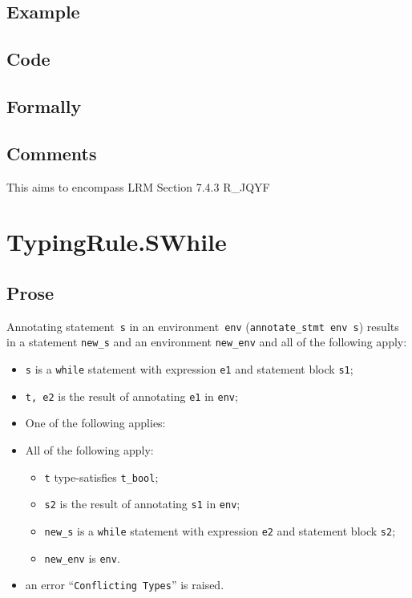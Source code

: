 \documentclass{book}
\begin{document}
  \subsection{Example}

  \subsection{Code}

\begin{emptyformal}
    \subsection{Formally}
\end{emptyformal}

\subsection{Comments}
    This aims to encompass LRM Section 7.4.3 R\_JQYF


\section{TypingRule.SWhile \label{sec:TypingRule.SWhile}}

  \subsection{Prose}
Annotating statement~\texttt{s} in an environment~\texttt{env}
(\texttt{annotate\_stmt env s}) results in a statement \texttt{new\_s} and an
environment \texttt{new\_env} and all of the following apply:
   \begin{itemize}
   \item \texttt{s} is a \texttt{while} statement with expression \texttt{e1} and statement block \texttt{s1};
   \item \texttt{t, e2} is the result of annotating \texttt{e1} in \texttt{env};
   \item One of the following applies:
     \item All of the following apply:
       \begin{itemize}
       \item \texttt{t} type-satisfies \texttt{t\_bool};
       \item \texttt{s2} is the result of annotating \texttt{s1} in \texttt{env};
       \item \texttt{new\_s} is a \texttt{while} statement with expression \texttt{e2} and statement block \texttt{s2};
       \item \texttt{new\_env} is \texttt{env}.
       \end{itemize}
     \item an error ``\texttt{Conflicting Types}'' is raised.
   \end{itemize}
\end{document}
